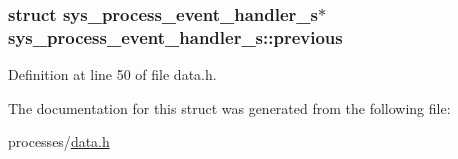 \subsubsection[{previous}]{\setlength{\rightskip}{0pt plus 5cm}struct {\bf sys\+\_\+process\+\_\+event\+\_\+handler\+\_\+s}$\ast$ sys\+\_\+process\+\_\+event\+\_\+handler\+\_\+s\+::previous}\label{structsys__process__event__handler__s_abbb4742265dace5feffc2a1b05d5271c}


Definition at line 50 of file data.\+h.



The documentation for this struct was generated from the following file\+:\begin{DoxyCompactItemize}
\item 
processes/\hyperlink{data_8h}{data.\+h}\end{DoxyCompactItemize}
